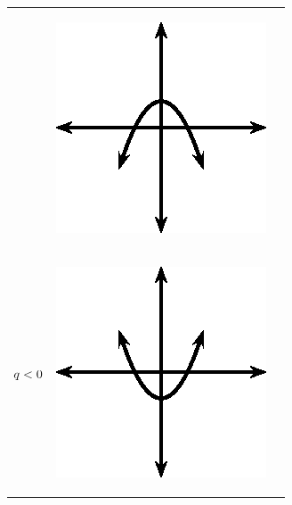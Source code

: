 \begin{center}
\begin{xtabular*}{\mytablewidth}[t]{|p{10\mystarwidth}|p{10\mystarwidth}|p{10\mystarwidth}|}
\begin{center}
      \vspace{2pt}
    \vspace{.1in}
    \end{center}    
                 &
    \setcounter{subfigure}{0}
\label{m39345*id241979}
    \begin{center}
    \label{m39345*id241979!!!underscore!!!media}\label{m39345*id241979!!!underscore!!!printimage}\includegraphics[width=.3\columnwidth]{col11306.imgs/m39345_MG10C11_016.png} %
      \vspace{2pt}
    \vspace{.1in}
    \end{center}    
     \tabularnewline{}
                  $q<{}0$
                 &
    \setcounter{subfigure}{0}
\label{m39345*id242017}
    \begin{center}
    \label{m39345*id242017!!!underscore!!!media}\label{m39345*id242017!!!underscore!!!printimage}\includegraphics[width=.3\columnwidth]{col11306.imgs/m39345_MG10C11_017.png} %

\end{center}
\end{xtabular*}
\end{center}
